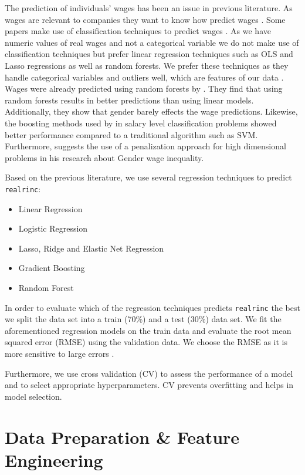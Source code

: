 \documentclass[11pt,a4paper]{article}
\begin{document}
The prediction of individuals' wages has been an issue in previous
literature. As wages are relevant to companies they want to know how
predict wages \autocite{Chakraborti}. Some papers make use of
classification techniques to predict wages \autocite{Chakraborti}. As we
have numeric values of real wages and not a categorical variable we do
not make use of classification techniques but prefer linear regression
techniques such as OLS and Lasso regressions as well as random forests.
We prefer these techniques as they handle categorical variables and
outliers well, which are features of our data \autocite{Cutler}. Wages
were already predicted using random forests by \autocite{Eichinger}.
They find that using random forests results in better predictions than
using linear models. Additionally, they show that gender barely effects
the wage predictions. Likewise, the boosting methods used by
\autocite{Chakrabarty2018} in salary level classification problems
showed better performance compared to a traditional algorithm such as
SVM. Furthermore, \autocite{BonaccoltoToepfer1612} suggests the use of a
penalization approach for high dimensional problems in his research
about Gender wage inequality.

Based on the previous literature, we use several regression techniques
to predict \texttt{realrinc}:

\begin{itemize}
\item
  Linear Regression
\item
  Logistic Regression
\item
  Lasso, Ridge and Elastic Net Regression
\item
  Gradient Boosting
\item
  Random Forest
\end{itemize}

In order to evaluate which of the regression techniques predicts
\texttt{realrinc} the best we split the data set into a train (70\%) and
a test (30\%) data set. We fit the aforementioned regression models on
the train data and evaluate the root mean squared error (RMSE) using the
validation data. We choose the RMSE as it is more sensitive to large
errors \autocite{Arour}.

Furthermore, we use cross validation (CV) to assess the performance of a
model and to select appropriate hyperparameters. CV prevents overfitting
and helps in model selection.

\hypertarget{data-preparation-feature-engineering}{%
\section{Data Preparation \& Feature
Engineering}\label{data-preparation-feature-engineering}}
\end{document}
